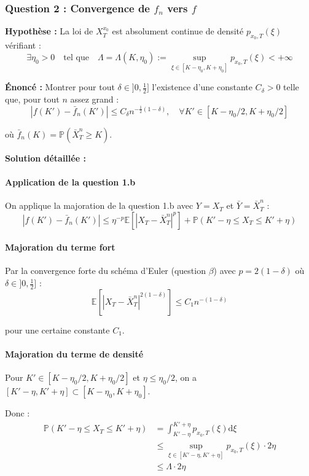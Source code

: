 \documentclass[12pt,a4paper]{article}
\theoremstyle{definition}
\theoremstyle{remark}
\newcommand{\E}{\mathbb{E}}
\newcommand{\Prob}{\mathbb{P}}
\newcommand{\dd}{\mathrm{d}}
\begin{document}
\subsubsection{Question 2 : Convergence de $f_n$ vers $f$}

\textbf{Hypothèse :} La loi de $X_T^{x_0}$ est absolument continue de densité $p_{x_0,T}(\xi)$ vérifiant :
\[
\exists \eta_0 > 0 \quad \text{tel que} \quad \Lambda = \Lambda(K, \eta_0) := \sup_{\xi \in [K-\eta_0, K+\eta_0]} p_{x_0,T}(\xi) < +\infty
\]

\textbf{Énoncé :} Montrer pour tout $\delta \in ]0, \frac{1}{2}]$ l'existence d'une constante $C_\delta > 0$ telle que, pour tout $n$ assez grand :
\[
|f(K') - \bar{f}_n(K')| \leq C_\delta n^{-\frac{1}{2}(1-\delta)}, \quad \forall K' \in [K - \eta_0/2, K + \eta_0/2]
\]

où $\bar{f}_n(K) = \Prob(\bar{X}_T^n \geq K)$.

\textbf{Solution détaillée :}

\paragraph{Application de la question 1.b}

On applique la majoration de la question 1.b avec $Y = X_T$ et $\bar{Y} = \bar{X}_T^n$ :
\[
|f(K') - \bar{f}_n(K')| \leq \eta^{-p}\E[|X_T - \bar{X}_T^n|^p] + \Prob(K' - \eta \leq X_T \leq K' + \eta)
\]

\paragraph{Majoration du terme fort}

Par la convergence forte du schéma d'Euler (question $\beta$) avec $p = 2(1-\delta)$ où $\delta \in ]0, \frac{1}{2}]$ :
\[
\E[|X_T - \bar{X}_T^n|^{2(1-\delta)}] \leq C_1 n^{-(1-\delta)}
\]

pour une certaine constante $C_1$.

\paragraph{Majoration du terme de densité}

Pour $K' \in [K - \eta_0/2, K + \eta_0/2]$ et $\eta \leq \eta_0/2$, on a $[K' - \eta, K' + \eta] \subset [K - \eta_0, K + \eta_0]$.

Donc :
\begin{align*}
\Prob(K' - \eta \leq X_T \leq K' + \eta) &= \int_{K'-\eta}^{K'+\eta} p_{x_0,T}(\xi)\dd\xi \\
&\leq \sup_{\xi \in [K'-\eta, K'+\eta]} p_{x_0,T}(\xi) \cdot 2\eta \\
&\leq \Lambda \cdot 2\eta
\end{align*}
\end{document}

